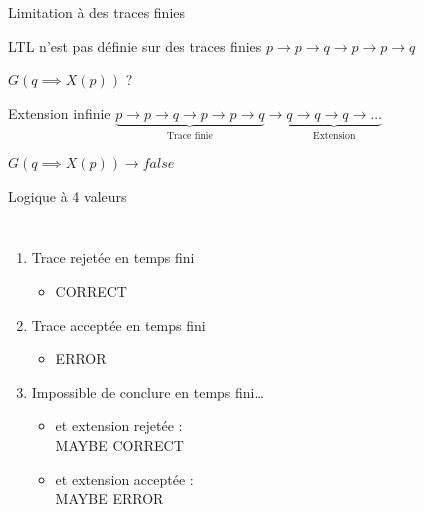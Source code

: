 \documentclass{beamer}
\begin{document}
\begin{frame}{Limitation à des traces finies}

  \begin{alertblock}{LTL n'est pas définie sur des traces finies}
    \center
    $p \rightarrow p \rightarrow q \rightarrow p \rightarrow p
      \rightarrow q$

      $G (q \implies X(p))$ ?
  \end{alertblock}

  \begin{block}{Extension infinie}
    \center
    $\underbrace{p \rightarrow p \rightarrow q \rightarrow p \rightarrow p
      \rightarrow q}_{\text{Trace finie}} \rightarrow
    \underbrace{q \rightarrow q \rightarrow q \rightarrow \dots}_{\text{Extension}}$

    $G (q \implies X(p)) \rightarrow false$
  \end{block}
\end{frame}

\begin{frame}{Logique à 4 valeurs}
  \begin{columns}

  \begin{enumerate}
    \setlength{\itemsep}{1.5em}
  \item Trace rejetée en temps fini
    \begin{itemize}
      \item CORRECT
    \end{itemize}
  \item Trace acceptée en temps fini
    \begin{itemize}
      \item ERROR
    \end{itemize}
  \item Impossible de conclure en temps fini\dots
    \begin{itemize}
      \item et extension rejetée : \\MAYBE CORRECT
      \item et extension acceptée : \\MAYBE ERROR
    \end{itemize}
  \end{enumerate}

\end{columns}
\end{frame}
\end{document}
